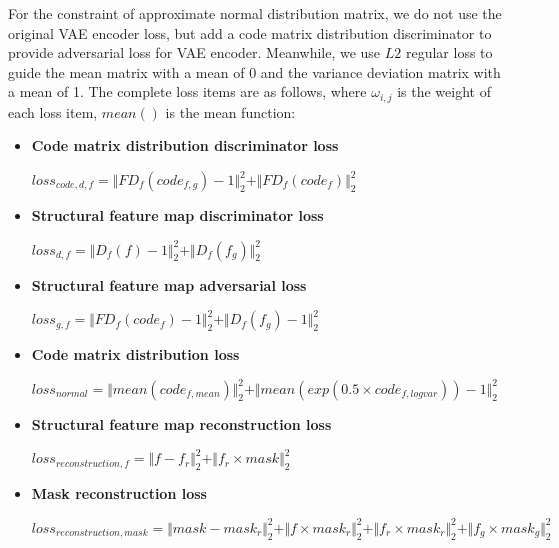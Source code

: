 \documentclass[letterpaper]{article} %
\begin{document}
For the constraint of approximate normal distribution matrix, we do not use the original VAE encoder loss, but add a code matrix distribution discriminator to provide adversarial loss for VAE encoder. Meanwhile, we use $L2$ regular loss to guide the mean matrix with a mean of 0 and the variance deviation matrix with a mean of 1.
The complete loss items are as follows, where $\omega_{i,j}$ is the weight of each loss item, $mean()$ is the mean function: 
\begin{itemize}
	\item \textbf{Code matrix distribution discriminator loss} 
	\begin{center}
		$loss_{code,d,f}=\Vert{FD_f(code_{f,g})-1}\Vert_{2}^{2}+\Vert{FD_f(code_f)}\Vert_{2}^{2}$
	\end{center}
	
	\item \textbf{Structural feature map discriminator loss} 
	\begin{center}
		$loss_{d,f}=\Vert{D_f(f)-1}\Vert_{2}^{2}+\Vert{D_f(f_g )}\Vert_{2}^{2}$
	\end{center}
	
	\item \textbf{Structural feature map adversarial loss} 
	\begin{center}
		$loss_{g,f}=\Vert{FD_f(code_f)-1}\Vert_{2}^{2}+\Vert{D_f(f_g)-1}\Vert_{2}^{2}$
	\end{center}
	
	\item \textbf{Code matrix distribution loss } 
	\begin{center}
		$loss_{normal}=\Vert{mean(code_{f,mean})}\Vert_{2}^{2}+ \Vert{mean(exp(0.5\times code_{f,logvar}))-1}\Vert_{2}^{2}$
	\end{center}
	
	\item \textbf{Structural feature map reconstruction loss} 
	\begin{center}
		$loss_{reconstruction,f}=\Vert{f-f_r}\Vert_{2}^{2}+\Vert{f_r\times mask}\Vert_{2}^{2}$
	\end{center}
	
	\item \textbf{Mask reconstruction loss}
	\begin{center}
		$loss_{reconstruction,mask}=\Vert{mask-mask_r }\Vert_{2}^{2}+\Vert{f\times mask_r}\Vert_{2}^{2}+\Vert{f_r\times mask_r}\Vert_{2}^{2}+\Vert{f_g\times mask_g}\Vert_{2}^{2}$
	\end{center}
\end{itemize}
\end{document}
